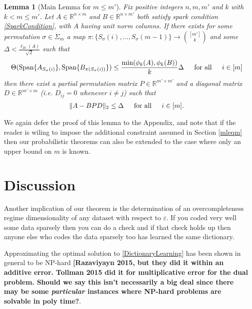\documentclass[journal, onecolumn]{IEEEtran}
\newtheorem{lemma}{Lemma}
\begin{document}
\begin{lemma}[Main Lemma for $m \leq m'$]\label{MainLemma2}
Fix positive integers $n, m, m'$ and $k$ with $k < m \leq m'$. Let $A \in \mathbb{R}^{n \times m}$ and $B \in \mathbb{R}^{n \times m'}$ both satisfy spark condition \eqref{SparkCondition}, with $A$ having unit norm columns. If there exists for some permutation $\sigma \in \Sigma_m$ a map $\pi: \{S_{\sigma}(i), \ldots, S_{\sigma}(m-1)\} \to {[m'] \choose k}$ and some $\Delta < \frac{\ell_{2k}(A)}{\sqrt{2}}$ such that 
\begin{equation}\label{GapUpperBound2}
\Theta(\text{Span}\{A_{S_\sigma(i)}\}, \text{Span}\{B_{\pi(S_\sigma(i))}\}) \leq \frac{ \min(\phi_k(A), \phi_k(B)) }{k} \Delta \indent \text{for all} \indent i \in [m]
\end{equation}
%
then there exist a partial permutation matrix $P \in \mathbb{R}^{m' \times m'}$ and a diagonal matrix $D \in \mathbb{R}^{m' \times m}$ (i.e. $D_{ij} = 0$ whenever $i \neq j$) such that
\begin{align}
\|A - BPD\|_2 \leq \Delta \indent \text{for all} \indent i \in [m].
\end{align}
\end{lemma}

We again defer the proof of this lemma to the Appendix, and note that if the reader is wiling to impose the additional constraint assumed in Section \ref{mleqm} then our probabilistic theorems can also be extended to the case where only an upper bound on $m$ is known.


\section{Discussion}


Another implication of our theorem is the determination of an overcompleteness regime dimensionality of any dataset with respect to $\varepsilon$. If you coded very well some data sparsely then you can do a check and if that check holds up then anyone else who codes the data sparsely too has learned the same dictionary. 

Approximating the optimal solution to \eqref{DictionaryLearning} has been shown in general to be NP-hard \cite{Razaviyayn} \textbf{[Razaviyayn 2015, but they did it within an additive error. Tollman 2015 did it for multiplicative error for the dual problem. Should we say this isn't necessarily a big deal since there may be some \emph{particular} instances where NP-hard problems are solvable in poly time?}. 
\end{document}
